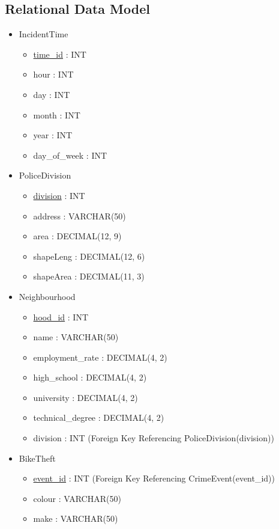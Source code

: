 \documentclass[12pt, a4paper]{article}
\begin{document}
\subsection*{Relational Data Model}
\begin{itemize}
    \item IncidentTime
    \begin{itemize}
        \item \underline{time\_id} : INT 
        \item hour : INT
        \item day : INT 
        \item month : INT
        \item year : INT
        \item day\_of\_week : INT
    \end{itemize}
    \item PoliceDivision
        \begin{itemize}
        \item \underline{division} : INT
        \item address : VARCHAR(50)
        \item area : DECIMAL(12, 9)
        \item shapeLeng : DECIMAL(12, 6)
        \item shapeArea : DECIMAL(11, 3) 
    \end{itemize}
    \item Neighbourhood
        \begin{itemize}
        \item \underline{hood\_id} : INT
        \item name : VARCHAR(50) 
        \item employment\_rate : DECIMAL(4, 2) 
        \item high\_school : DECIMAL(4, 2) 
        \item university : DECIMAL(4, 2)
        \item technical\_degree : DECIMAL(4, 2)
        \item division : INT (Foreign Key Referencing  PoliceDivision(division))
    \end{itemize}
    \item BikeTheft
        \begin{itemize}
        \item \underline{event\_id} : INT (Foreign Key Referencing CrimeEvent(event\_id))
        \item colour : VARCHAR(50)
        \item make : VARCHAR(50)

\end{itemize}
\end{itemize}
\end{document}
